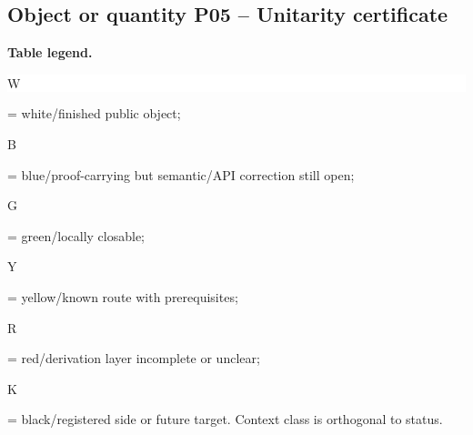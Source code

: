 \subsection*{Object or quantity P05 -- Unitarity certificate}
\hypertarget{objproof:P05}{}
\par\smallskip\noindent\begin{minipage}{0.99\linewidth}\footnotesize\raggedright\textbf{Table legend.} \colorbox{white}{\strut W} = white/finished public object; \colorbox{cyan!20}{\strut B} = blue/proof-carrying but semantic/API correction still open; \colorbox{green!18}{\strut G} = green/locally closable; \colorbox{yellow!25}{\strut Y} = yellow/known route with prerequisites; \colorbox{red!20}{\strut R} = red/derivation layer incomplete or unclear; \colorbox{black!18}{\strut K} = black/registered side or future target. Context class is orthogonal to status.\end{minipage}\par\vspace{0.25em}
